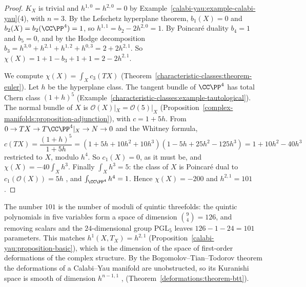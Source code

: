 \begin{proof}
$K_X$ is trivial and $h^{1,0} = h^{2,0} = 0$ by Example~\ref{calabi-yau:example-calabi-yau}(4), with $n = 3$. By the Lefschetz hyperplane theorem, $b_1(X) = 0$ and $b_2(X) = b_2(\CC\PP^4) = 1$,
so $h^{1,1} = b_2 - 2h^{2,0} = 1$. By Poincar\'e duality $b_4 = 1$ and $b_5 = 0$, and by the Hodge decomposition $b_3 = h^{3,0} + h^{2,1} + h^{1,2} + h^{0,3} = 2 + 2h^{2,1}$. So
$\chi(X) = 1 + 1 - b_3 + 1 + 1 = 2 - 2h^{2,1}$.

We compute $\chi(X) = \int_Xc_3(TX)$ (Theorem~\ref{characteristic-classes:theorem-euler}). Let $h$ be the hyperplane class. The tangent bundle of $\CC\PP^4$ has total Chern class $(1 + h)^5$
(Example~\ref{characteristic-classes:example-tautological}). The normal bundle of $X$ is $\mathcal{O}(X)|_X = \mathcal{O}(5)|_X$ (Proposition~\ref{complex-manifolds:proposition-adjunction}),
with $c = 1 + 5h$. From $0 \to TX \to T\CC\PP^4|_X \to N \to 0$ and the Whitney formula,
\[
c(TX) = \frac{(1 + h)^5}{1 + 5h} = (1 + 5h + 10h^2 + 10h^3)(1 - 5h + 25h^2 - 125h^3) = 1 + 10h^2 - 40h^3
\]
restricted to $X$, modulo $h^4$. So $c_1(X) = 0$, as it must be, and $\chi(X) = -40\int_Xh^3$. Finally $\int_Xh^3 = 5$: the class of $X$ is Poincar\'e dual to $c_1(\mathcal{O}(X)) = 5h$
\cite[Chapter 1, Section 1]{griffiths-harris}, and $\int_{\CC\PP^4}h^4 = 1$. Hence $\chi(X) = -200$ and $h^{2,1} = 101$.
\end{proof}

\begin{remark}\label{calabi-yau:remark-moduli-count}
The number $101$ is the number of moduli of quintic threefolds: the quintic polynomials in five variables form a space of dimension $\binom{9}{4} = 126$, and removing scalars and the
$24$-dimensional group $\mathrm{PGL}_5$ leaves $126 - 1 - 24 = 101$ parameters. This matches $h^1(X, T_X) = h^{2,1}$ (Proposition~\ref{calabi-yau:proposition-basic}), which is the
dimension of the space of first-order deformations of the complex structure. By the Bogomolov--Tian--Todorov theorem the deformations of a Calabi--Yau manifold are
unobstructed, so its Kuranishi space is smooth of dimension $h^{n-1,1}$ \cite{tian-1987}, \cite{todorov-1989}
(Theorem~\ref{deformations:theorem-btt}).
\end{remark}

